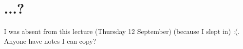 \section{...?}

I was absent from this lecture (Thursday 12 September)
(because I slept in) :(. Anyone have notes I can copy?
\newpage
